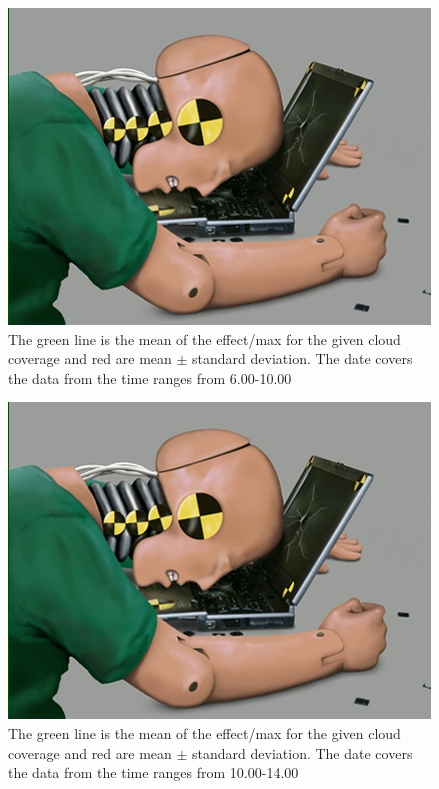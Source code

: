 \begin{figure}
  \centering
  \includegraphics{dummy.jpg}
  \caption{The green line is the mean of the effect/max for the given
    cloud coverage and red are mean $\pm$ standard deviation.  The
    date covers the data from the time ranges from 6.00-10.00}
  \label{fig:stat0610}
\end{figure}

\begin{figure}
  \centering
  \includegraphics{dummy.jpg}
  \caption{The green line is the mean of the effect/max for the given
    cloud coverage and red are mean $\pm$ standard deviation.  The
    date covers the data from the time ranges from 10.00-14.00}
  \label{fig:stat1014}
\end{figure}

